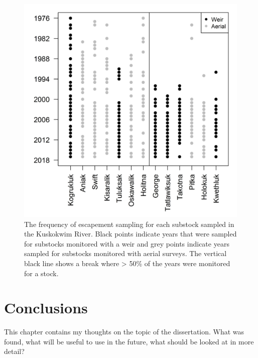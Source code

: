 \documentclass[12pt,]{book}
\theoremstyle{definition}
\theoremstyle{definition}
\theoremstyle{definition}
\theoremstyle{remark}
\begin{document}
\clearpage

\begin{figure}
  \centering
  \includegraphics{img/Ch4/obs-freq.jpg}
  \caption{The frequency of escapement sampling for each substock sampled in the Kuskokwim River. Black points indicate years that were sampled for substocks monitored with a weir and grey points indicate years sampled for substocks monitored with aerial surveys. The vertical black line shows a break where > 50\% of the years were monitored for a stock.}
  \label{fig:obs-freq}
\end{figure}

\chapter{Conclusions}\label{ch5}

This chapter contains my thoughts on the topic of the dissertation. What
was found, what will be useful to use in the future, what should be
looked at in more detail?

\setlength{\parskip}{6pt plus 2pt minus 1pt}


\end{document}
